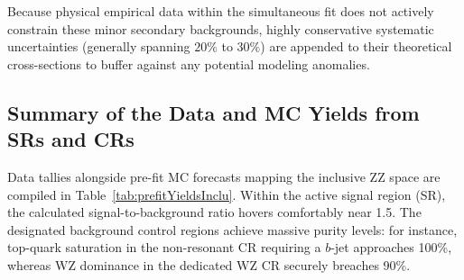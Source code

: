 Because physical empirical data within the simultaneous fit does not actively constrain these minor secondary backgrounds, highly conservative systematic uncertainties (generally spanning $20\%$ to $30\%$) are appended to their theoretical cross-sections to buffer against any potential modeling anomalies.

\subsection{Summary of the Data and MC Yields from SRs and CRs}
\label{sec:summary-table}

Data tallies alongside pre-fit MC forecasts mapping the inclusive $\text{ZZ}$ space are compiled in Table~\ref{tab:prefitYieldsInclu}. Within the active signal region (SR), the calculated signal-to-background ratio hovers comfortably near 1.5. The designated background control regions achieve massive purity levels: for instance, top-quark saturation in the non-resonant CR requiring a $b$-jet approaches 100\%, whereas $\text{WZ}$ dominance in the dedicated $\text{WZ}$ CR securely breaches 90\%.


